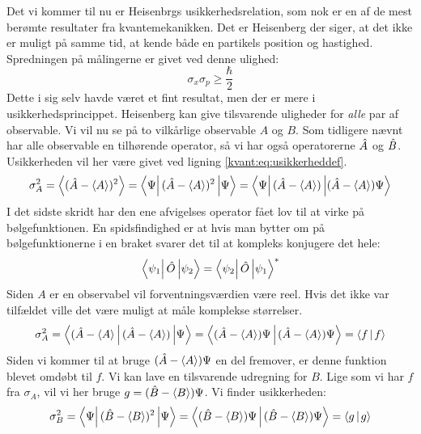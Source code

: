 \documentclass[../Kvantemekanik.tex]{subfiles}
\begin{document}
Det vi kommer til nu er Heisenbrgs usikkerhedsrelation, som nok er en af de mest berømte resultater fra kvantemekanikken. Det er Heisenberg der siger, at det ikke er muligt på samme tid, at kende både en partikels position og hastighed. Spredningen på målingerne er givet ved denne ulighed:
\begin{equation}
\sigma_x\sigma_p \geq \frac{\hbar}{2}
\label{kvant:eq:heisenbergxp}
\end{equation}
Dette i sig selv havde været et fint resultat, men der er mere i usikkerhedsprincippet. Heisenberg kan give tilsvarende uligheder for {\em alle} par af observable. Vi vil nu se på to vilkårlige observable $A$ og $B$. Som tidligere nævnt har alle observable en tilhørende operator, så vi har også operatorerne $\hat A$ og $\hat B$. Usikkerheden vil her være givet ved ligning \eqref{kvant:eq:usikkerheddef}.
\begin{equation}
    \sigma_A^2 = \expect{(\op A - \expect A)^2} = \matrixel{\Psi}{(\op A-\expect A)^2}{\Psi} = \matrixel{\Psi}{(\op A-\expect A)}{(\op A-\expect A)\Psi}
\end{equation}
I det sidste skridt har den ene afvigelses operator fået lov til at virke på bølgefunktionen. En spidsfindighed er at hvis man bytter om på bølgefunktionerne i en braket svarer det til at kompleks konjugere det hele:
\begin{equation}
\matrixel{\psi_1}{\op O}{\psi_2} = \matrixel{\psi_2}{\op O}{\psi_1}^*
\end{equation}
Siden $A$ er en observabel vil forventningsværdien være reel. Hvis det ikke var tilfældet ville det være muligt at måle komplekse størrelser.
\begin{equation}
    \sigma_A^2 = \matrixel{(\op A - \expect A}{(\op A - \expect A)}{\Psi} = \braket{(\op A-\expect A)\Psi}{(\op A-\expect A)\Psi}= \braket{f}{f}
\end{equation}
Siden vi kommer til at bruge $(\hat A-\left< A \right>)\Psi$ en del fremover, er denne funktion blevet omdøbt til $f$.
Vi kan lave en tilsvarende udregning for $B$. Lige som vi har $f$ fra $\sigma_A$, vil vi her bruge $g=(\hat B -\left< B \right>)\Psi$. Vi finder usikkerheden:
\begin{equation}
    \sigma_B^2 = \matrixel{\Psi}{(\op B-\expect B)^2}{\Psi} = \braket{(\op B-\expect B)\Psi}{(\op B-\expect B)\Psi}= \braket{g}{g}
\end{equation}
\end{document}
